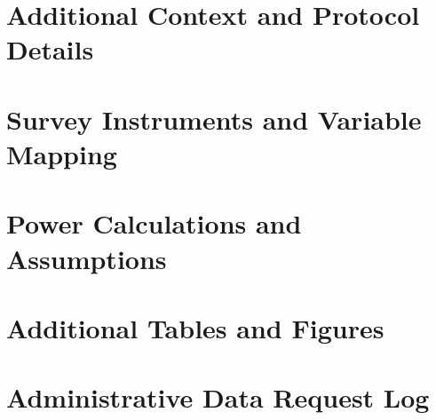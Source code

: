 \documentclass[12pt]{article}
\begin{document}
\appendix
\clearpage
\section{Additional Context and Protocol Details}

\section{Survey Instruments and Variable Mapping}

\section{Power Calculations and Assumptions}

\section{Additional Tables and Figures}

\section{Administrative Data Request Log}
\end{document}
